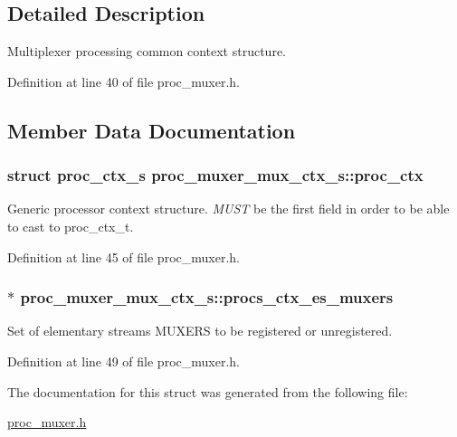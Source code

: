 \subsection{Detailed Description}
Multiplexer processing common context structure. 

Definition at line 40 of file proc\+\_\+muxer.\+h.



\subsection{Member Data Documentation}
\subsubsection[{\texorpdfstring{proc\+\_\+ctx}{proc_ctx}}]{\setlength{\rightskip}{0pt plus 5cm}struct {\bf proc\+\_\+ctx\+\_\+s} proc\+\_\+muxer\+\_\+mux\+\_\+ctx\+\_\+s\+::proc\+\_\+ctx}\hypertarget{structproc__muxer__mux__ctx__s_a1d2b1128b9800f2d9c2b448b135ed485}{}\label{structproc__muxer__mux__ctx__s_a1d2b1128b9800f2d9c2b448b135ed485}
Generic processor context structure. {\itshape M\+U\+ST} be the first field in order to be able to cast to proc\+\_\+ctx\+\_\+t. 

Definition at line 45 of file proc\+\_\+muxer.\+h.

\subsubsection[{\texorpdfstring{procs\+\_\+ctx\+\_\+es\+\_\+muxers}{procs_ctx_es_muxers}}]{$\ast$ proc\+\_\+muxer\+\_\+mux\+\_\+ctx\+\_\+s\+::procs\+\_\+ctx\+\_\+es\+\_\+muxers}\hypertarget{structproc__muxer__mux__ctx__s_a84af6e2e29870974e5fdd964ba5b0898}{}\label{structproc__muxer__mux__ctx__s_a84af6e2e29870974e5fdd964ba5b0898}
Set of elementary streams M\+U\+X\+E\+RS to be registered or unregistered. 

Definition at line 49 of file proc\+\_\+muxer.\+h.



The documentation for this struct was generated from the following file\+:\begin{DoxyCompactItemize}
\item 
\hyperlink{proc__muxer_8h}{proc\+\_\+muxer.\+h}\end{DoxyCompactItemize}

